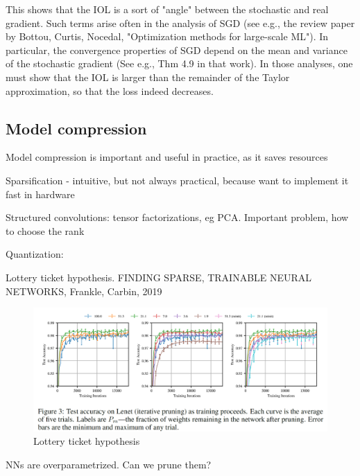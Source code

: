 \documentclass[english]{article}
\begin{document}
This shows that the IOL is a sort of "angle" between the stochastic and real gradient. Such terms arise often in the analysis of SGD (see e.g., the review paper by Bottou, Curtis, Nocedal, "Optimization methods for large-scale ML"). In particular, the convergence properties of SGD depend on the mean and variance of the stochastic gradient (See e.g., Thm 4.9 in that work). In those analyses, one must show that the IOL is larger than the remainder of the Taylor approximation, so that the loss indeed decreases. 

\eenum 



\subsection{Model compression}


\benum 
\item Model compression is important and useful in practice, as it saves resources

\item Sparsification - intuitive, but not always practical, because want to implement it fast in hardware 

\item Structured convolutions: tensor factorizations, eg PCA. Important problem, how to choose the rank

\item Quantization:

\item Lottery ticket hypothesis. FINDING SPARSE, TRAINABLE NEURAL NETWORKS, Frankle, Carbin, 2019

\begin{figure}
  \centering
  \includegraphics[width=\textwidth]{lot.png}
  \caption{Lottery ticket hypothesis}
  \label{lot}
\end{figure}

NNs are overparametrized. Can we prune them?
\end{document}
